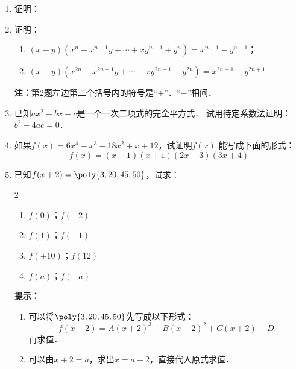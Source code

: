 \begin{enumerate}
\item 证明：
\begin{enumerate}
\end{enumerate}

\item 证明：
\begin{enumerate}
    \item $(x-y)(x^n+x^{n-1}y+\cdots +xy^{n-1}+y^n)=x^{n+1}-y^{n+1}$；
    \item $(x+y)(x^{2n}-x^{2n-1}y+\cdots -xy^{2n-1}+y^{2n})=x^{2n+1}+y^{2n+1}$
\end{enumerate}
\textbf{注：}第2题左边第二个括号内的符号是“$+$”、“$-$”相间．

\item  已知$ax^2+bx+c$是一个一次二项式的完全平方式．
试用待定系数法证明：$b^2-4ac=0$．
\item  如果$f(x)=6x^4-x^3-18x^2+x+12$，试证明$f(x)$
能写成下面的形式：
\[f(x)=(x-1)(x+1)(2x-3)(3x+4)\]
\item 已知$f(x+2)=\poly{3,20,45,50}$，试求：
    \begin{multicols}{2}
\begin{enumerate}
    \item $f(0)$；$f(-2)$
    \item $f(1)$；$f(-1)$
    \item $f(+10)$；$f(12)$
    \item $f(a)$；$f(-a)$
\end{enumerate}
\end{multicols}
\textbf{提示：}
\begin{enumerate}
    \item 可以将$\poly{3,20,45,50}$先写成以下形式：
    \[f(x+2)=A(x+2)^3+B(x+2)^2+C(x+2)+D\]
    再求值．
    \item 可以由$x+2=a$，求出$x=a-2$，直接代入原式求值．
\end{enumerate}

\end{enumerate}


